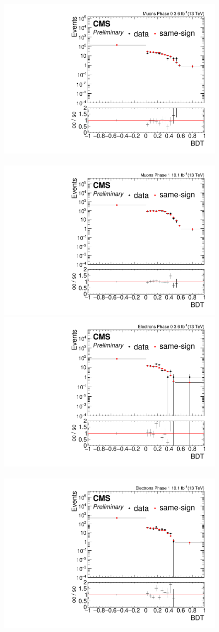 \begin{figure}[!htb]
\centering
\includegraphics[width=0.48\linewidth]{plots/partial_unblinded_track_muon_sc_comparison/none_exTrack_dilepBDT_binsCorrJetNoMultIso10Dr0.6_log.pdf} \,
\includegraphics[width=0.48\linewidth]{plots/partial_unblinded_track_muon_sc_comparison_phase1/none_exTrack_dilepBDT_binsCorrJetNoMultIso10Dr0.6_log.pdf} \\

\includegraphics[width=0.48\linewidth]{plots/partial_unblinded_track_electrons_sc_comparison/none_exTrack_dilepBDT_binsCorrJetNoMultIso10Dr0.5_log.pdf} \,
\includegraphics[width=0.48\linewidth]{plots/partial_unblinded_track_electrons_sc_comparison_phase1/none_exTrack_dilepBDT_binsCorrJetNoMultIso10Dr0.5_log.pdf} \\


\end{figure}
